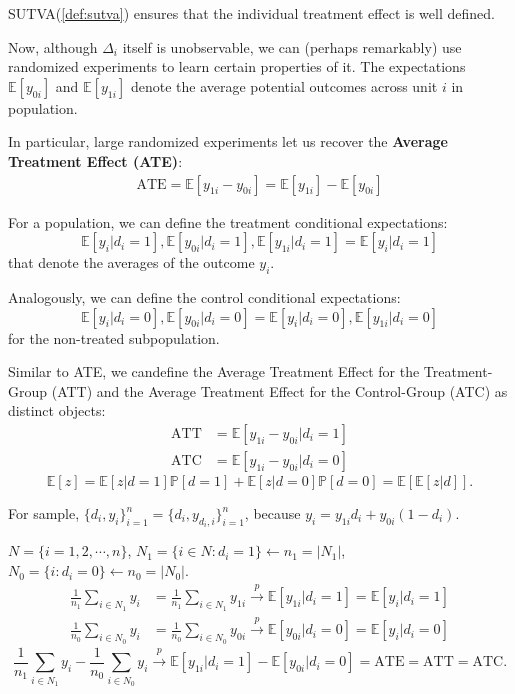 SUTVA(\ref{def:sutva}) ensures that the individual treatment effect is well defined.

Now, although $\Delta_i$ itself is unobservable, we can (perhaps remarkably) 
use randomized experiments to learn certain properties of it. The expectations
$\mathbb{E}[y_{0i}]$ and $\mathbb{E}[y_{1i}]$ denote the average potential outcomes across unit $i$ in population.

In particular, large randomized experiments let us recover the \textbf{Average
Treatment Effect (ATE)}:
\begin{gather*}
  \text{ATE} = \mathbb{E}[y_{1i} - y_{0i}] = \mathbb{E}[y_{1i}] - \mathbb{E}[y_{0i}]
\end{gather*}

For a population, we can define the treatment conditional expectations:
\[\mathbb{E}[y_i | d_i=1], \mathbb{E}[y_{0i} | d_i=1 ], \mathbb{E}[y_{1i} | d_i=1 ] = \mathbb{E}[y_i | d_i=1]\]
that denote the averages of the outcome $y_i$.

Analogously, we can define the control conditional expectations:
\[\mathbb{E}[y_i | d_i=0], \mathbb{E}[y_{0i} | d_i=0 ] = \mathbb{E}[y_i | d_i=0], \mathbb{E}[y_{1i} | d_i=0 ]\]
for the non-treated subpopulation.

Similar to ATE, we candefine the Average Treatment Effect for the Treatment-Group (ATT) and the Average
Treatment Effect for the Control-Group (ATC) as distinct objects:
\begin{align*}
  \text{ATT} &= \mathbb{E}[y_{1i}- y_{0i} | d_i=1]\\
  \text{ATC} &= \mathbb{E}[y_{1i}- y_{0i} | d_i=0]
\end{align*}
\[\mathbb{E}[z] = \mathbb{E}[z|d=1] \mathbb{P}[d=1] + \mathbb{E}[z|d=0] \mathbb{P}[d=0] = \mathbb{E}[\mathbb{E}[z|d]].\]

For sample, $\{d_i, y_i\}_{i=1}^n = \{d_i, y_{d_{i}, i}\}_{i=1}^n$, because
$y_i = y_{1i} d_i + y_{0i} (1 - d_i)$.

$N = \{i=1,2,\cdots, n\}$, $N_1 = \{i \in N: d_i = 1\} \leftarrow n_1 = \vert N_1 \vert $, $N_0 = \{i: d_i = 0\} \leftarrow n_0 = \vert N_0 \vert $.
\begin{align*}
  \frac{1}{n_1} \sum_{i \in N_1} y_i &= \frac{1}{n_1} \sum_{i \in N_1} y_{1i} \overset{p}{\rightarrow} \mathbb{E}[y_{1i} | d_i=1] = \mathbb{E}[y_i | d_i=1]\\
  \frac{1}{n_0} \sum_{i \in N_0} y_i &= \frac{1}{n_0} \sum_{i \in N_0} y_{0i} \overset{p}{\rightarrow} \mathbb{E}[y_{0i} | d_i=0] = \mathbb{E}[y_i | d_i=0]
\end{align*}
\[\frac{1}{n_1} \sum_{i \in N_1} y_i - \frac{1}{n_0} \sum_{i \in N_0} y_i \overset{p}{\rightarrow} \mathbb{E}[y_{1i} | d_i = 1] - \mathbb{E}[y_{0i} | d_i = 0] = \text{ATE} = \text{ATT} = \text{ATC}.\]


